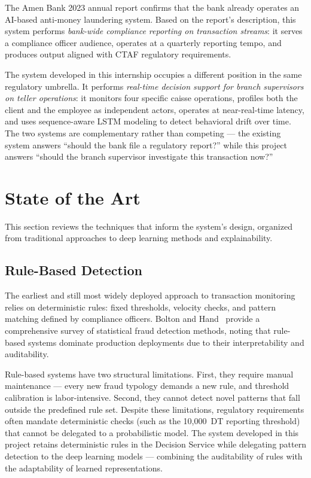 The Amen Bank 2023 annual report confirms that the bank already operates
an AI-based anti-money laundering system. Based on the report's
description, this system performs \textit{bank-wide compliance reporting on
transaction streams}: it serves a compliance officer audience, operates at
a quarterly reporting tempo, and produces output aligned with
CTAF regulatory requirements.

The system developed in this internship occupies a different position in
the same regulatory umbrella. It performs \textit{real-time decision
support for branch supervisors on teller operations}: it monitors four
specific caisse operations, profiles both the client and the employee as
independent actors, operates at near-real-time latency, and uses
sequence-aware LSTM modeling to detect behavioral drift over time. The
two systems are complementary rather than competing --- the existing
system answers ``should the bank file a regulatory report?'' while this
project answers ``should the branch supervisor investigate this
transaction now?''


\section{State of the Art}
\label{sec:state-of-art}

This section reviews the techniques that inform the system's design,
organized from traditional approaches to deep learning methods and
explainability.

\subsection{Rule-Based Detection}

The earliest and still most widely deployed approach to transaction
monitoring relies on deterministic rules: fixed thresholds, velocity
checks, and pattern matching defined by compliance officers. Bolton and
Hand~\cite{bolton2002} provide a comprehensive survey of statistical
fraud detection methods, noting that rule-based systems dominate
production deployments due to their interpretability and auditability.

Rule-based systems have two structural limitations. First, they require
manual maintenance --- every new fraud typology demands a new rule, and
threshold calibration is labor-intensive. Second, they cannot detect
novel patterns that fall outside the predefined rule set. Despite these
limitations, regulatory requirements often mandate deterministic checks
(such as the 10,000~DT reporting threshold) that cannot be delegated to
a probabilistic model. The system developed in this project retains
deterministic rules in the Decision Service while delegating pattern
detection to the deep learning models --- combining the auditability
of rules with the adaptability of learned representations.


